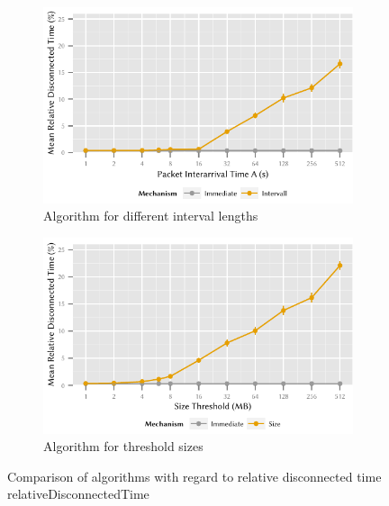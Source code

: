 \begin{figure}
	\begin{subfigure}[b]{\textwidth}
	\centering
	\includegraphics{application/cloud_file_synchronization/numerical_evaluation/figures/interval_disconnected}
	\caption{Algorithm \algointerval for different interval lengths}\label{fig:application:cloud_file_synchronisation:numerical_evaluation:disconnected:disconnected:interval}
	\end{subfigure} 
	\begin{subfigure}[b]{\textwidth}
	\centering
	\includegraphics{application/cloud_file_synchronization/numerical_evaluation/figures/size_disconnected}
	\caption{Algorithm \algosize for threshold sizes}\label{fig:application:cloud_file_synchronisation:numerical_evaluation:disconnected:disconnected:size}
	\end{subfigure}

	\caption{Comparison of algorithms with regard to relative disconnected time relativeDisconnectedTime}\label{fig:application:cloud_file_synchronisation:numerical_evaluation:disconnected:disconnected}
\end{figure}


